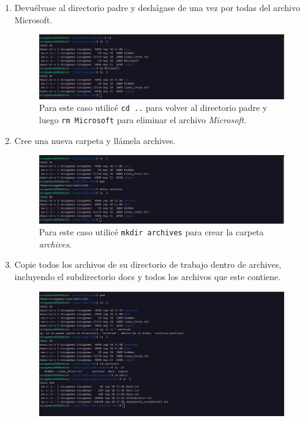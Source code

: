 \documentclass{templateNote}
\begin{document}
\begin{enumerate}
\begin{enumerate}[label=\alph*)]
\begin{figure}[H]
        \end{figure}
        \item Devuélvase al directorio padre y deshágase de una vez por todas del archivo Microsoft.
        \begin{figure}[H]
            \centering
            \includegraphics[width=\textwidth]{img/ejerc5d.png}
            Para este caso utilicé \texttt{cd ..} para volver al directorio padre y luego \texttt{rm Microsoft} para eliminar el archivo \textit{Microsoft}.
        \end{figure}
        \item Cree una nueva carpeta y llámela archives.
        \begin{figure}[H]
            \centering
            \includegraphics[width=\textwidth]{img/ejerc5e.png}
            Para este caso utilicé \texttt{mkdir archives} para crear la carpeta \textit{archives}.
        \end{figure}
        \item Copie todos los archivos de su directorio de trabajo dentro de archives, incluyendo el subdirectorio docs y todos los archivos que este contiene.
        \begin{figure}[H]
            \centering
            \includegraphics[width=\textwidth]{img/ejerc5f.png}

\end{figure}
\end{enumerate}
\end{enumerate}
\end{document}
